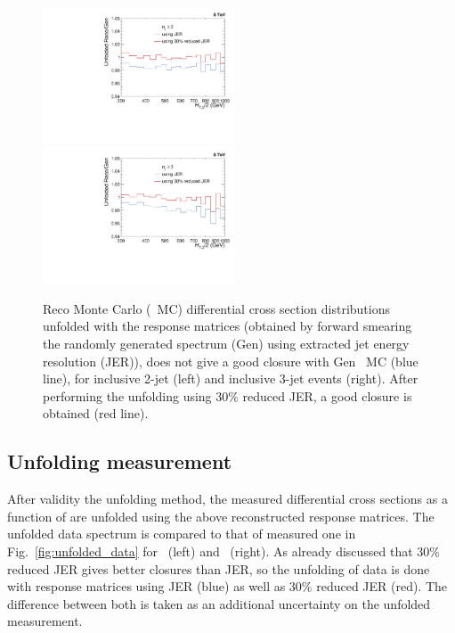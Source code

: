 \begin{figure}[!htp]
 \begin{center}
 \includegraphics[width=0.51\textwidth]{Plots_HT_2_150/Comparison_closure_2_range.pdf}%
 ~~\includegraphics[width=0.51\textwidth]{Plots_HT_2_150/Comparison_closure_3.pdf}
 \caption{Reco \MadGraphF \plus \PYTHIAS Monte Carlo (\MGP~MC) differential cross section distributions unfolded with the response matrices (obtained by forward smearing the randomly generated spectrum (Gen) using extracted jet energy resolution (JER)), does not give a good closure with Gen \MGP~MC (blue line), for inclusive 2-jet (left) and inclusive 3-jet events (right). After performing the unfolding using 30\% reduced JER, a good closure is obtained (red line).}
 \label{fig:unfolded_reco_NLO}
 \end{center}
\end{figure}

\subsection{Unfolding measurement}
After validity the unfolding method, the measured differential cross sections as a function of \httwo are unfolded using the above reconstructed response matrices. The unfolded data spectrum is compared to that of measured one in Fig.~\ref{fig:unfolded_data} for \njt~(left) and \njth~(right). As already discussed that 30\% reduced JER gives better closures than JER, so the unfolding of data is done with response matrices using JER (blue) as well as 30\% reduced JER (red). The difference between both is taken as an additional uncertainty on the unfolded measurement. %

